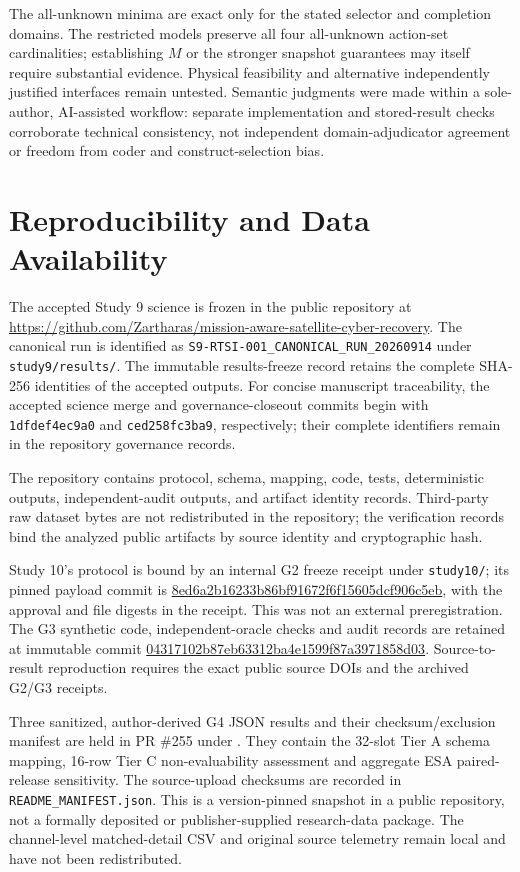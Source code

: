 \documentclass[preprint,12pt]{elsarticle}
\begin{document}
The all-unknown minima are exact only for the stated selector and completion domains. The restricted models preserve all four all-unknown action-set cardinalities; establishing $M$ or the stronger snapshot guarantees may itself require substantial evidence. Physical feasibility and alternative independently justified interfaces remain untested. Semantic judgments were made within a sole-author, AI-assisted workflow: separate implementation and stored-result checks corroborate technical consistency, not independent domain-adjudicator agreement or freedom from coder and construct-selection bias.

\section{Reproducibility and Data Availability}

The accepted Study 9 science is frozen in the public repository at
\url{https://github.com/Zartharas/mission-aware-satellite-cyber-recovery}.
The canonical run is identified as
\texttt{S9-RTSI-001\_CANONICAL\_RUN\_20260914} under \texttt{study9/results/}.
The immutable results-freeze record retains the complete SHA-256 identities of the accepted outputs. For concise manuscript traceability, the accepted science merge and governance-closeout commits begin with \texttt{1dfdef4ec9a0} and \texttt{ced258fc3ba9}, respectively; their complete identifiers remain in the repository governance records.

The repository contains protocol, schema, mapping, code, tests, deterministic outputs, independent-audit outputs, and artifact identity records. Third-party raw dataset bytes are not redistributed in the repository; the verification records bind the analyzed public artifacts by source identity and cryptographic hash.


Study 10's protocol is bound by an internal G2 freeze receipt under \texttt{study10/}; its pinned payload commit is \url{8ed6a2b16233b86bf91672f6f15605dcf906c5eb}, with the approval and file digests in the receipt. This was not an external preregistration. The G3 synthetic code, independent-oracle checks and audit records are retained at immutable commit \url{04317102b87eb63312ba4e1599f87a3971858d03}. Source-to-result reproduction requires the exact public source DOIs and the archived G2/G3 receipts.

Three sanitized, author-derived G4 JSON results and their checksum/exclusion manifest are held in PR \#255 under . They contain the 32-slot Tier A schema mapping, 16-row Tier C non-evaluability assessment and aggregate ESA paired-release sensitivity. The source-upload checksums are recorded in \texttt{README\_MANIFEST.json}. This is a version-pinned snapshot in a public repository, not a formally deposited or publisher-supplied research-data package. The channel-level matched-detail CSV and original source telemetry remain local and have not been redistributed.
\end{document}
